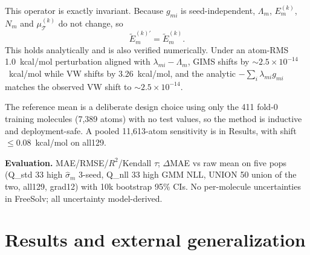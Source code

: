 \documentclass{article}
\begin{document}
This operator is exactly invariant. Because $g_{mi}$ is seed-independent,
$\Lambda_m$, $E_m^{(k)}$, $N_m$ and $\mu_{\mathcal T}^{(k)}$ do not change, so
\[
\widetilde{E}_m^{(k)\prime}=\widetilde{E}_m^{(k)} .
\]
This holds analytically and is also verified numerically. Under an atom-RMS
1.0~kcal/mol perturbation aligned with $\lambda_{mi}-\Lambda_m$, GIMS shifts
by $\sim2.5\times10^{-14}$~kcal/mol while VW shifts by 3.26~kcal/mol, and the
analytic $ -\sum_i\lambda_{mi}g_{mi}$ matches the observed VW shift to
$\sim2.5\times10^{-14}$.

The reference mean is a deliberate design choice using only the 411
fold-0 training molecules (7{,}389 atoms) with no test values, so the method
is inductive and deployment-safe. A pooled 11{,}613-atom sensitivity is in
Results, with shift $\le0.08$~kcal/mol on all129.

\textbf{Evaluation.} MAE/RMSE/$R^2$/Kendall $\tau$; $\Delta$MAE vs raw mean on five pops
(Q\_std 33 high $\hat\sigma_m$ 3-seed, Q\_nll 33 high GMM NLL, UNION 50 union of the two, all129, grad12) with 10k bootstrap 95\% CIs.
No per-molecule uncertainties in FreeSolv; all uncertainty model-derived.

\section{Results and external generalization}
\label{sec:external}
\end{document}
